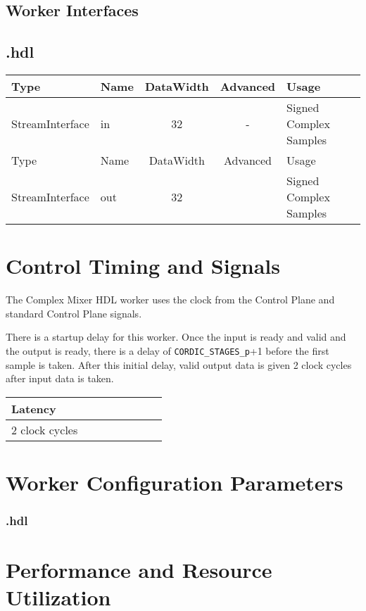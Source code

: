 \begin{landscape}
	\section*{Worker Interfaces}
	\subsection*{\comp.hdl}
	\begin{scriptsize}
		\begin{tabular}{|M{2cm}|M{1.5cm}|c|c|M{12cm}|}
			\hline
			Type            & Name & DataWidth & Advanced  & Usage\\
			\hline
			StreamInterface & in   & 32        & -			& Signed Complex Samples\\
			\hline
			Type            & Name & DataWidth & Advanced	& Usage\\
			\hline
			StreamInterface & out  & 32        & 			& Signed Complex Samples\\
			\hline
		\end{tabular}
	\end{scriptsize}
\end{landscape}

\section*{Control Timing and Signals}
\begin{flushleft}
	The Complex Mixer HDL worker uses the clock from the Control Plane and standard Control Plane signals.\medskip

	There is a startup delay for this worker. Once the input is ready and valid and the output is ready, there is a delay of \verb+CORDIC_STAGES_p++1 before the first sample is taken. After this initial delay, valid output data is given 2 clock cycles after input data is taken.

	\begin{tabular}{|M{4.5cm}|M{1cm}|M{1cm}|M{1.5cm}|M{2cm}|M{1cm}|M{1cm}|M{2.5cm}|}
		\hline
		Latency         \\
		 clock cycles  \\
		\hline
	\end{tabular}
\end{flushleft}

\begin{landscape}
\section*{Worker Configuration Parameters}
\subsubsection*{\comp.hdl}

\section*{Performance and Resource Utilization}

\end{landscape}
